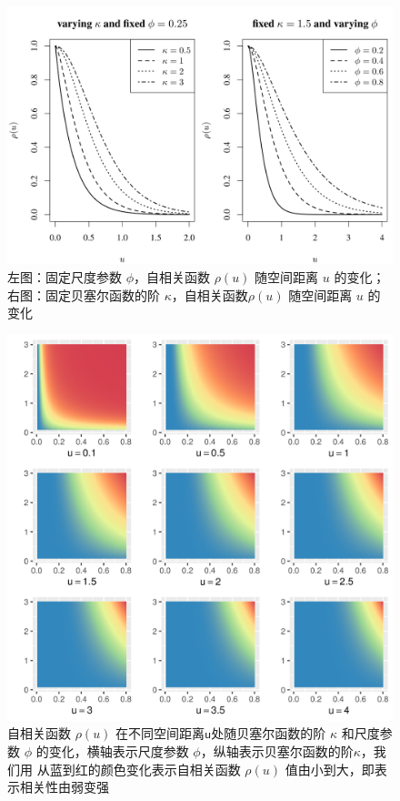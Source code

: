 \documentclass[12pt,a4paper,UTF8,twoside]{book}
\theoremstyle{definition}
\theoremstyle{definition}
\theoremstyle{definition}
\theoremstyle{remark}
\begin{document}
\begin{figure}

{\centering \includegraphics[width=0.8\linewidth]{figures/matern} 

}

\caption{左图：固定尺度参数 $\phi$，自相关函数 $\rho(u)$ 随空间距离 $u$ 的变化；右图：固定贝塞尔函数的阶 $\kappa$，自相关函数$\rho(u)$ 随空间距离 $u$ 的变化}\label{fig:matern-2d}
\end{figure}
\begin{figure}

{\centering \includegraphics[width=0.8\linewidth]{figures/matern-3d} 

}

\caption{自相关函数 $\rho(u)$ 在不同空间距离$\mathsf{u}$处随贝塞尔函数的阶 $\kappa$ 和尺度参数 $\phi$ 的变化，横轴表示尺度参数 $\phi$，纵轴表示贝塞尔函数的阶$\kappa$，我们用 从蓝到红的颜色变化表示自相关函数 $\rho(u)$ 值由小到大，即表示相关性由弱变强}\label{fig:matern-3d}
\end{figure}
\end{document}
